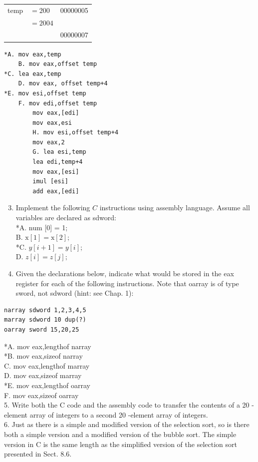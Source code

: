 \documentclass[10pt]{book}
\begin{document}
\begin{center}
\begin{center}
\begin{center}
\begin{center}
\begin{tabular}{rl|l|}
temp & $=200$ & 00000005 \\
 & $=2004$ &  \\
 &  & 00000007 \\
\hline
\end{tabular}
\end{center}

\begin{verbatim}
*A. mov eax,temp
    B. mov eax,offset temp
*C. lea eax,temp
    D. mov eax, offset temp+4
*E. mov esi,offset temp
    F. mov edi,offset temp
        mov eax,[edi]
        mov eax,esi
        H. mov esi,offset temp+4
        mov eax,2
        G. lea esi,temp
        lea edi,temp+4
        mov eax,[esi]
        imul [esi]
        add eax,[edi]
\end{verbatim}

\begin{enumerate}
  \setcounter{enumi}{2}
  \item Implement the following $C$ instructions using assembly language. Assume all variables are declared as sdword:\\[0pt]
*A. num [0] = 1;\\
B. $\mathrm{x}[1]=\mathrm{x}[2]$;\\
*C. $y[i+1]=y[i]$;\\
D. $z[i]=z[j] ;$
  \item Given the declarations below, indicate what would be stored in the eax register for each of the following instructions. Note that oarray is of type sword, not sdword (hint: see Chap. 1):
\end{enumerate}

\begin{verbatim}
narray sdword 1,2,3,4,5
marray sdword 10 dup(?)
oarray sword 15,20,25
\end{verbatim}

*A. mov eax,lengthof narray\\
*B. mov eax,sizeof narray\\
C. mov eax,lengthof marray\\
D. mov eax,sizeof marray\\
*E. mov eax,lengthof oarray\\
F. mov eax,sizeof oarray\\
5. Write both the C code and the assembly code to transfer the contents of a 20 -element array of integers to a second 20 -element array of integers.\\
6. Just as there is a simple and modified version of the selection sort, so is there both a simple version and a modified version of the bubble sort. The simple version in C is the same length as the simplified version of the selection sort presented in Sect. 8.6.\\


\end{center}
\end{center}
\end{center}
\end{document}
